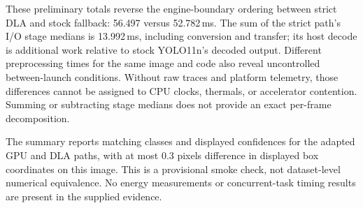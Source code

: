 These preliminary totals reverse the engine-boundary ordering between strict
DLA and stock fallback: 56.497 versus 52.782\,ms. The sum of the strict path's
I/O stage medians is 13.992\,ms, including conversion and transfer; its host
decode is additional work relative to stock YOLO11n's decoded output. Different
preprocessing times for the same image and code also reveal uncontrolled
between-launch conditions. Without raw traces and platform telemetry, those
differences cannot be assigned to CPU clocks, thermals, or accelerator
contention. Summing or subtracting stage medians does not provide an exact
per-frame decomposition.

The summary reports matching classes and displayed confidences for the adapted
GPU and DLA paths, with at most 0.3 pixels difference in displayed box
coordinates on this image. This is a provisional smoke check, not dataset-level
numerical equivalence. No energy measurements or concurrent-task timing results
are present in the supplied evidence.
